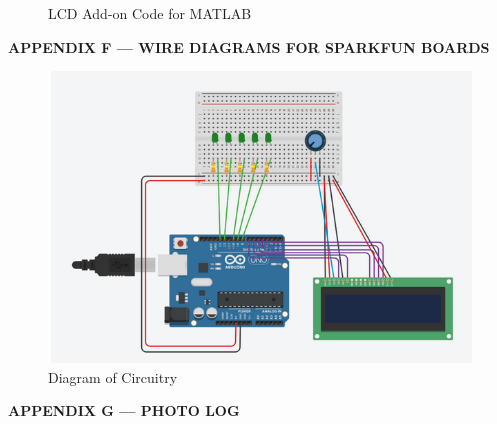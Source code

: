 \documentclass[conference]{IEEEtran}
\begin{document}
\begin{figure}[h!]
  \caption{LCD Add-on Code for MATLAB}
\end{figure}
\vspace{-15pt}


\newpage


 \hspace{.5in}   \textbf{APPENDIX F — WIRE DIAGRAMS FOR SPARKFUN BOARDS}  

 \begin{figure}[H]
   \centering
   \includegraphics[width=.9\textwidth]{Figures/WireDiagram1.png}
   \caption{Diagram of Circuitry}
   \label{fig:3}
 \end{figure}

 \newpage


 \hspace{.5in}   \textbf{APPENDIX G — PHOTO LOG}  

\newpage
\end{document}
